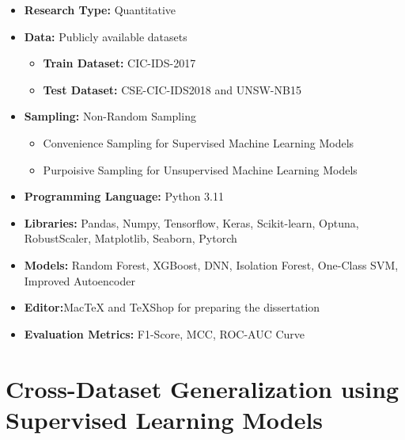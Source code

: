 \begin{itemize}[nosep, leftmargin=*, itemsep=0pt, parsep=0pt, topsep=2pt]
    \item \textbf{Research Type:} Quantitative
    \item \textbf{Data:} Publicly available datasets
        \begin{itemize}
            \item \textbf{Train Dataset:} CIC-IDS-2017
            \item \textbf{Test Dataset:} CSE-CIC-IDS2018 and UNSW-NB15
            \end{itemize}
    \item \textbf{Sampling:} Non-Random Sampling
            \begin{itemize}
                \item Convenience Sampling for Supervised Machine Learning Models
                \item Purpoisive Sampling for Unsupervised Machine Learning Models
            \end{itemize}   
    \item \textbf{Programming Language:} Python 3.11
    \item \textbf{Libraries:} Pandas, Numpy, Tensorflow, Keras, Scikit-learn, Optuna, RobustScaler, Matplotlib, Seaborn, Pytorch
    \item \textbf{Models:} Random Forest, XGBoost, DNN, Isolation Forest, One-Class SVM, Improved Autoencoder
    \item \textbf{Editor:}MacTeX and TeXShop for preparing the dissertation
    \item \textbf{Evaluation Metrics:} F1-Score, MCC, ROC-AUC Curve
\end{itemize}


\section{Cross-Dataset Generalization using Supervised Learning Models}

